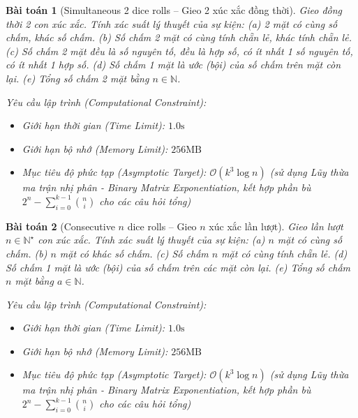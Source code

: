 \documentclass{article}
\newtheorem{baitoan}{Bài toán}
\begin{document}
\begin{baitoan}[Simultaneous 2 dice rolls -- Gieo 2 xúc xắc đồng thời]
	Gieo đồng thời 2 con xúc xắc. Tính xác suất lý thuyết của sự kiện: (a) 2 mặt có cùng số chấm, khác số chấm. (b) Số chấm 2 mặt có cùng tính chẵn lẻ, khác tính chẵn lẻ. (c) Số chấm 2 mặt đều là số nguyên tố, đều là hợp số, có ít nhất 1 số nguyên tố, có ít nhất 1 hợp số. (d) Số chấm 1 mặt là ước (bội) của số chấm trên mặt còn lại. (e) Tổng số chấm 2 mặt bằng $n\in\mathbb{N}$.

    \vspace{0.5em}
    \emph{Yêu cầu lập trình (Computational Constraint):}
    \begin{itemize}
        \item Giới hạn thời gian (Time Limit): $1.0\mathrm{s}$
        \item Giới hạn bộ nhớ (Memory Limit): $256\mathrm{MB}$
        \item Mục tiêu độ phức tạp (Asymptotic Target): $\mathcal{O}(k^3 \log n)$ (sử dụng Lũy thừa ma trận nhị phân - Binary Matrix Exponentiation, kết hợp phần bù $2^n - \sum_{i=0}^{k-1} \binom{n}{i}$ cho các câu hỏi tổng)
    \end{itemize}
\end{baitoan}


\begin{baitoan}[Consecutive $n$ dice rolls -- Gieo $n$ xúc xắc lần lượt]
	Gieo lần lượt $n\in\mathbb{N}^\star$ con xúc xắc. Tính xác suất lý thuyết của sự kiện: (a) $n$ mặt có cùng số chấm. (b) $n$ mặt có khác số chấm. (c) Số chấm $n$ mặt có cùng tính chẵn lẻ. (d) Số chấm 1 mặt là ước (bội) của số chấm trên các mặt còn lại. (e) Tổng số chấm $n$ mặt bằng $a\in\mathbb{N}$.

    \vspace{0.5em}
    \emph{Yêu cầu lập trình (Computational Constraint):}
    \begin{itemize}
        \item Giới hạn thời gian (Time Limit): $1.0\mathrm{s}$
        \item Giới hạn bộ nhớ (Memory Limit): $256\mathrm{MB}$
        \item Mục tiêu độ phức tạp (Asymptotic Target): $\mathcal{O}(k^3 \log n)$ (sử dụng Lũy thừa ma trận nhị phân - Binary Matrix Exponentiation, kết hợp phần bù $2^n - \sum_{i=0}^{k-1} \binom{n}{i}$ cho các câu hỏi tổng)
    \end{itemize}
\end{baitoan}
\end{document}
